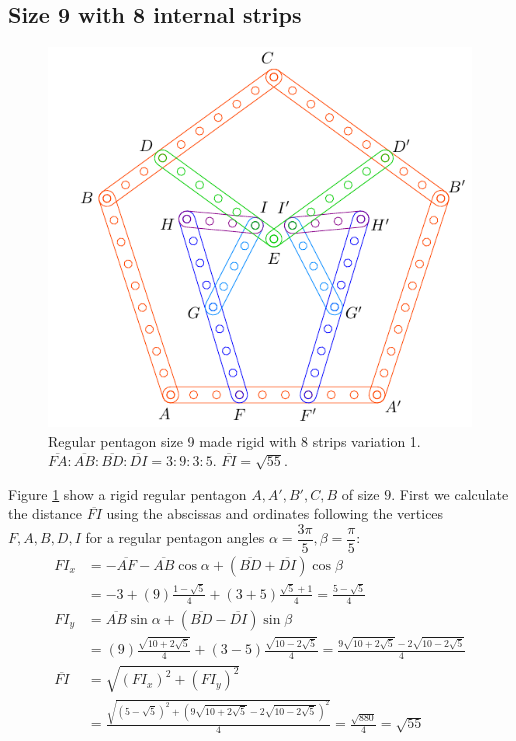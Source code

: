 \documentclass[11pt]{article}
\begin{document}
\subsection{Size 9 with 8 internal strips}

\begin{figure}[H]
 \centering
 \includegraphics[scale=0.95]{9/penta9-8a}
 \caption{Regular pentagon size 9 made rigid with 8 strips variation 1. $\overline{FA}:\overline{AB}:\overline{BD}:\overline{DI} = 3:9:3:5$. $\overline{FI} = \sqrt{55}$.}
 \label{fig:penta9-8a}
\end{figure}

Figure \ref{fig:penta9-8a} show a rigid regular pentagon $A,A',B',C,B$ of size $9$. First we calculate the distance $\overline{FI}$ using the abscissas and ordinates following the vertices $F,A,B,D,I$ for a regular pentagon angles $\alpha=\dfrac{3\pi}5, \beta=\dfrac{\pi}5$:
\begin{align}
FI_x &= -\overline{AF} - \overline{AB}\cos\alpha + (\overline{BD} + \overline{DI})\cos\beta\nonumber\\
 &= -3 + (9)\frac{1-\sqrt5}4 + (3+5)\frac{\sqrt5+1}4 = \frac{5-\sqrt5}4\\
FI_y &= \overline{AB}\sin\alpha + (\overline{BD}-\overline{DI})\sin\beta\nonumber\\
 &= (9)\frac{\sqrt{10+2\sqrt5}}4 + (3-5)\frac{\sqrt{10-2\sqrt5}}4
 = \frac{9\sqrt{10+2\sqrt5} - 2\sqrt{10-2\sqrt5}}4\\
\overline{FI} &= \sqrt{(FI_x)^2 + (FI_y)^2}\nonumber\\
 &= \frac{\sqrt{(5-\sqrt5)^2 + (9\sqrt{10+2\sqrt5} - 2\sqrt{10-2\sqrt5})^2}}4
 = \frac{\sqrt{880}}4 = \sqrt{55}
\end{align}
\end{document}
